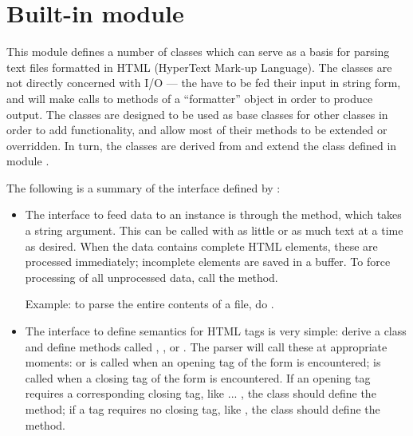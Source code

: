 \section{Built-in module }

\renewcommand{\indexsubitem}{(in module htmllib)}

This module defines a number of classes which can serve as a basis for
parsing text files formatted in HTML (HyperText Mark-up Language).
The classes are not directly concerned with I/O --- the have to be fed
their input in string form, and will make calls to methods of a
``formatter'' object in order to produce output.  The classes are
designed to be used as base classes for other classes in order to add
functionality, and allow most of their methods to be extended or
overridden.  In turn, the classes are derived from and extend the
class  defined in module .

The following is a summary of the interface defined by
:

\begin{itemize}

\item
The interface to feed data to an instance is through the 
method, which takes a string argument.  This can be called with as
little or as much text at a time as desired.  When the data contains complete
HTML elements, these are processed immediately; incomplete elements
are saved in a buffer.  To force processing of all unprocessed data,
call the  method.

Example: to parse the entire contents of a file, do
.

\item
The interface to define semantics for HTML tags is very simple: derive
a class and define methods called ,
, or .  The parser will
call these at appropriate moments:  or
 is called when an opening tag of the form
 is encountered;  is called
when a closing tag of the form  is encountered.  If
an opening tag requires a corresponding closing tag, like 
... , the class should define the 
method; if a tag requires no closing tag, like , the class
should define the  method.

\end{itemize}

